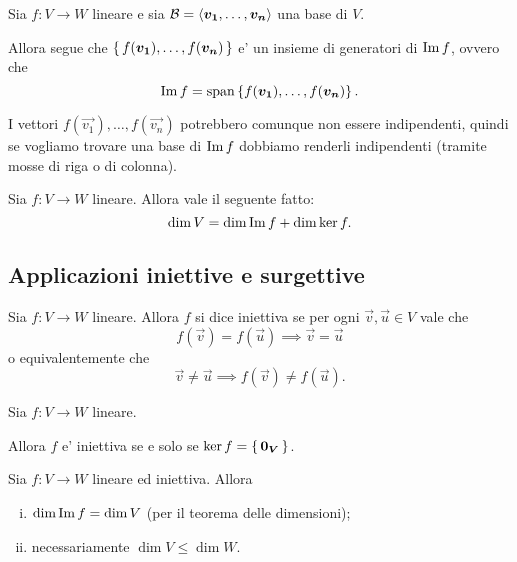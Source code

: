 \begin{proposition}\label{base_mappata_generatori_immagine}
    Sia $f : V \to W$ lineare e sia $\mathcal{B} = \left\langle \bm{v_1}, \dots, \bm{v_n} \right\rangle$ una base di $V$. 
    
    Allora segue che $\left\{\, f(\bm{v_1}), \dots, f(\bm{v_n})\,\right\}$ e' un insieme di generatori di $\operatorname{Im}f$, ovvero che \[
        \operatorname{Im}f = \operatorname{span}\left\{f(\bm{v_1}), \dots, f(\bm{v_n})\right\}.  
    \]
\end{proposition}

\begin{remark}
    I vettori $f(\vec{v_1}), \dots, f(\vec{v_n})$ potrebbero comunque non essere indipendenti, quindi se vogliamo trovare una base di $\operatorname{Im}f$ dobbiamo renderli indipendenti (tramite mosse di riga o di colonna).
\end{remark}

\begin{theorem} 
     \label{th_dimensioni}
    Sia $f : V \to W$ lineare. Allora vale il seguente fatto:
    \begin{equation}
        \dim V = \dim \operatorname{Im}f + \dim \ker f.
    \end{equation}
\end{theorem}

\subsection{Applicazioni iniettive e surgettive}

\begin{definition}
    Sia $f : V \to W$ lineare. Allora $f$ si dice iniettiva se per ogni $\vec{v}, \vec{u} \in V$ vale che \[
        f(\vec{v}) = f(\vec{u}) \implies \vec{v} = \vec{u}
    \] o equivalentemente che \[
        \vec{v} \neq \vec{u} \implies f(\vec{v}) \neq f(\vec{u}).
    \]
\end{definition}

\begin{proposition}\label{ker_funzione_iniettiva}
    Sia $f : V \to W$ lineare. 
    
    Allora $f$ e' iniettiva se e solo se $\ker f = \left\{\,\bm{0_V}\,\right\}$. 
\end{proposition}

\begin{corollary}
    Sia $f : V \to W$ lineare ed iniettiva. Allora \begin{enumerate}[(i)]
        \item $\dim \operatorname{Im}f = \dim V$ (per il teorema delle dimensioni);
        \item necessariamente $\dim V \leq \dim W$.
    \end{enumerate}
\end{corollary}

